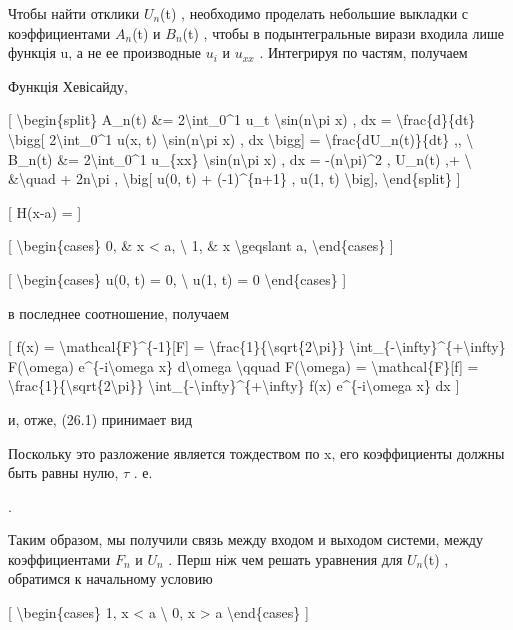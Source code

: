 \documentclass[
]{article}
\begin{document}
Чтобы найти отклики \(U_n\)(t) , необходимо проделать небольшие выкладки
с коэффициентами \(A_n\)(t) и \(B_n\)(t) , чтобы в подынтегральные
вирази входила лише функція u, а не ее производные \(u_i\) и \(u_{xx}\)
. Интегрируя по частям, получаем

Функція Хевісайду,

{[} \textbackslash begin\{split\} A\_n(t) \&=
2\textbackslash int\_0\^{}1 u\_t \textbackslash sin(n\textbackslash pi
x) , dx = \textbackslash frac\{d\}\{dt\} \textbackslash bigg{[}
2\textbackslash int\_0\^{}1 u(x, t)
\textbackslash sin(n\textbackslash pi x) , dx \textbackslash bigg{]} =
\textbackslash frac\{dU\_n(t)\}\{dt\} ,, \textbackslash{} B\_n(t) \&=
2\textbackslash int\_0\^{}1 u\_\{xx\}
\textbackslash sin(n\textbackslash pi x) , dx =
-(n\textbackslash pi)\^{}2 , U\_n(t) ,+ \textbackslash{}
\&\textbackslash quad + 2n\textbackslash pi , \textbackslash big{[} u(0,
t) + (-1)\^{}\{n+1\} , u(1, t) \textbackslash big{]},
\textbackslash end\{split\} {]}

{[} H(x-a) = {]}

{[} \textbackslash begin\{cases\} 0, \& x \textless{} a,
\textbackslash{} 1, \& x \textbackslash geqslant a,
\textbackslash end\{cases\} {]}

{[} \textbackslash begin\{cases\} u(0, t) = 0, \textbackslash{} u(1, t)
= 0 \textbackslash end\{cases\} {]}

в последнее соотношение, получаем

{[} f(x) = \textbackslash mathcal\{F\}\^{}\{-1\}{[}F{]} =
\textbackslash frac\{1\}\{\textbackslash sqrt\{2\textbackslash pi\}\}
\textbackslash int\_\{-\textbackslash infty\}\^{}\{+\textbackslash infty\}
F(\textbackslash omega) e\^{}\{-i\textbackslash omega x\}
d\textbackslash omega \textbackslash qquad F(\textbackslash omega) =
\textbackslash mathcal\{F\}{[}f{]} =
\textbackslash frac\{1\}\{\textbackslash sqrt\{2\textbackslash pi\}\}
\textbackslash int\_\{-\textbackslash infty\}\^{}\{+\textbackslash infty\}
f(x) e\^{}\{-i\textbackslash omega x\} dx {]}

и, отже, (26.1) принимает вид

Поскольку это разложение является тождеством по x, его коэффициенты
должны быть равны нулю, \(\tau\) . е.

.

Таким образом, мы получили связь между входом и выходом системи, между
коэффициентами \(F_n\) и \(U_n\) . Перш ніж чем решать уравнения для
\(U_n\)(t) , обратимся к начальному условию

{[} \textbackslash begin\{cases\} 1, \textbar x\textbar{} \textless{} a
\textbackslash{} 0, \textbar x\textbar{} \textgreater{} a
\textbackslash end\{cases\} {]}
\end{document}
